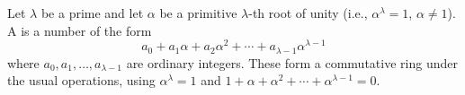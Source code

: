 Let $\lambda$ be a prime and let $\alpha$ be a primitive $\lambda$-th root of unity (i.e., $\alpha^\lambda = 1$, $\alpha \neq 1$). A  is a number of the form
$$a_0 + a_1\alpha + a_2\alpha^2 + \cdots + a_{\lambda-1}\alpha^{\lambda-1}$$
where $a_0, a_1, \ldots, a_{\lambda-1}$ are ordinary integers. These form a commutative ring under the usual operations, using $\alpha^\lambda = 1$ and $1 + \alpha + \alpha^2 + \cdots + \alpha^{\lambda-1} = 0$.
